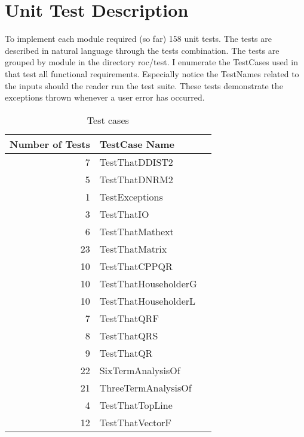 \documentclass[12pt, titlepage]{article}
\newcommand{\rref}[1]{(R\ref{#1})}
\begin{document}
\section{Unit Test Description}

To implement each module required (so far) 158 unit tests. The tests are described in natural language
through the tests  combination. The tests are grouped by module in the directory
roc/test. I enumerate the TestCases used in  that test all functional requirements.
Especially notice the TestNames related to the inputs should the reader run the test suite.
These tests demonstrate the exceptions thrown whenever a user error has occurred.


\begin{table}[h!]
\centering
\begin{tabular}{r p{} p{}}
\toprule
\textbf{Number of Tests} & \textbf{TestCase Name}\\
\midrule
  7 &  TestThatDDIST2\\
 5  &  TestThatDNRM2\\
 1  &  TestExceptions\\
 3  &  TestThatIO\\
 6  &  TestThatMathext\\
 23 &  TestThatMatrix\\
 10 &  TestThatCPPQR\\
 10 &  TestThatHouseholderG\\
 10 &  TestThatHouseholderL\\
 7  &  TestThatQRF\\
 8  &  TestThatQRS\\
 9  &  TestThatQR\\
 22 &  SixTermAnalysisOf\\
 21 &  ThreeTermAnalysisOf\\
 4  &  TestThatTopLine\\
 12 &  TestThatVectorF\\
  \bottomrule

\end{tabular}
  \caption{Test cases}
\label{tb:testcases}
\end{table}
\end{document}
